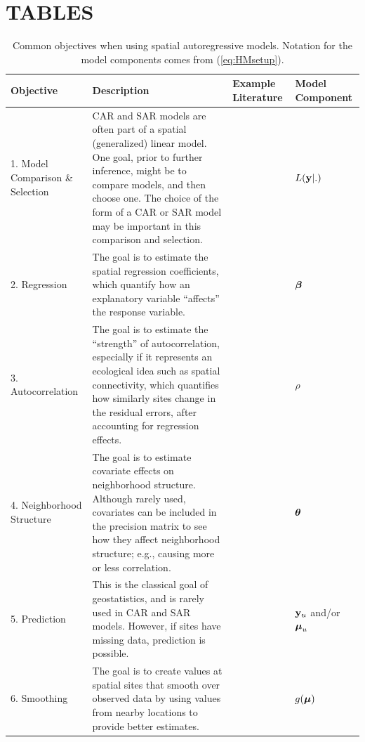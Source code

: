 \documentclass[11pt, titlepage]{article}\usepackage[]{graphicx}\usepackage[]{color}
\begin{document}
\section*{TABLES}
\begin{table}[ht]
	\caption{Common objectives when using spatial autoregressive models. Notation for the model components comes from (\ref{eq:HMsetup}). \label{Tab:ARobj}}
\begin{center}
{\footnotesize
\begin{tabular}{|p{0.9in}|p{3.0in}|p{0.8in}|p{0.8in}|}
	\hline
	Objective & Description & Example Literature & Model Component \\
	\hline
	\hline
	1. Model Comparison \& Selection & CAR and SAR models are often part of a spatial (generalized) linear model. One goal, prior to further inference, might be to compare models, and then choose one. The choice of the form of a CAR or SAR model may be important in this comparison and selection. & \citet{Hoot:Hobb:guid:2015} & $L(\mathbf{y}|.)$ \\
  \hline
	2. Regression & The goal is to estimate the spatial regression coefficients, which quantify how an explanatory variable ``affects'' the response variable. & \citet{Clay:Kald:empi:1987} & $\mbox{\boldmath $\beta$}$ \\
	\hline
	3. Autocorrelation & The goal is to estimate the ``strength'' of autocorrelation, especially if it represents an ecological idea such as spatial connectivity, which quantifies how similarly sites change in the residual errors, after accounting for regression effects.  & \citet{Gard:Lawl:Ver:Mago:Kell:coar:2010} & $\rho$ \\
	\hline
	4. Neighborhood Structure & The goal is to estimate covariate effects on neighborhood structure. Although rarely used, covariates can be included in the precision matrix to see how they affect neighborhood structure; e.g., causing more or less correlation. & \citet{Hank:Hoot:circ:2013} & $\mbox{\boldmath $\theta$}$ \\
	\hline
	5. Prediction & This is the classical goal of geostatistics, and is rarely used in CAR and SAR models. However, if sites have missing data, prediction is possible. &  \citet{Gard:Lawl:Ver:Mago:Kell:coar:2010} & $\mathbf{y}_u$ and/or $\mbox{\boldmath $\mu$}_u$ \\
	\hline
	6. Smoothing  & The goal is to create values at spatial sites that smooth over observed data by using values from nearby locations to provide better estimates. & \citet{Clay:Kald:empi:1987} & $g(\mbox{\boldmath $\mu$})$ \\
	\hline
\end{tabular}
}
\end{center}
\end{table}
\end{document}
